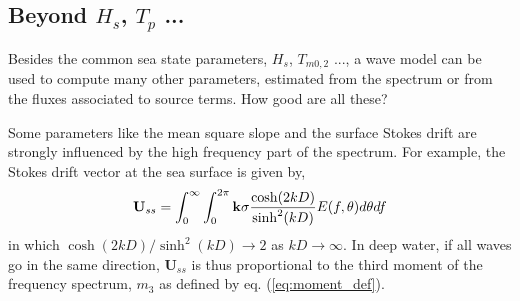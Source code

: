 


\subsection{Beyond $H_s$, $T_p$ ... }
Besides the common sea state parameters, $H_s$, $T_{m0,2}$  ..., 
a wave model can be used to compute many other parameters, estimated from the 
spectrum or from the fluxes associated to source terms. 
How good are all these? 

Some parameters like the mean square slope and the surface Stokes drift are 
strongly influenced by the high frequency part of the spectrum. For example, the Stokes drift vector at the sea surface is given by,
\begin{equation}
 \mathbf{U}_{ss} =  \int_{0}^{\infty}\int_{0}^{2\pi} \mathbf{k} \sigma \frac{\cosh(2kD)}{\sinh^2(kD)} E(f,\theta)d\theta df
\end{equation}
in which ${\cosh(2kD)}/{\sinh^2(kD)} \rightarrow 2$ as $kD \rightarrow \infty$. In deep water,  if all waves go in the same direction, $\mathbf{U}_{ss}$
is thus proportional to the third moment of the frequency spectrum, $m_{3}$ as defined by eq. (\ref{eq:moment_def}).



